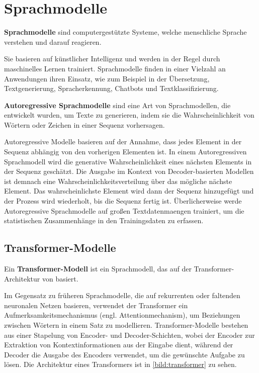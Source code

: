 \section{Sprachmodelle}\label{sec:sprachmodelle}

\begin{definition}\label{def:sprachmodell}
   \textbf{Sprachmodelle} sind computergestützte Systeme, welche menschliche Sprache  verstehen und darauf reagieren.
\end{definition}
Sie basieren auf künstlicher Intelligenz und werden in der Regel durch maschinelles Lernen trainiert.
Sprachmodelle finden in einer Vielzahl an Anwendungen ihren Einsatz, wie zum Beispiel in der Übersetzung,
Textgenerierung, Spracherkennung, Chatbots und Textklassifizierung.

\begin{definition}\label{def:autoregressive-sprachmodelle}
    \textbf{Autoregressive Sprachmodelle} sind eine Art von Sprachmodellen, die entwickelt wurden, um Texte zu generieren,
    indem sie die Wahrscheinlichkeit von Wörtern oder Zeichen in einer Sequenz vorhersagen.
\end{definition}

Autoregressive Modelle basieren auf der Annahme, dass jedes Element in der Sequenz abhängig von den vorherigen Elementen ist.
In einem Autoregressiven Sprachmodell wird die generative Wahrscheinlichkeit eines nächsten Elements in der Sequenz geschätzt.
Die Ausgabe im Kontext von Decoder-basierten Modellen ist demnach eine Wahrscheinlichkeitsverteilung über das mögliche nächste Element.
Das wahrscheinlichste Element wird dann der Sequenz hinzugefügt und der Prozess wird wiederholt, bis die Sequenz fertig ist.
Überlicherweise werde Autoregressive Sprachmodelle auf großen Textdatenmaengen trainiert, um die statistischen Zusammenhänge in den Trainingsdaten zu erfassen.

\subsection{Transformer-Modelle}\label{sec:grundlagen:transformer}

\begin{definition}\label{def:transformer-modell}
    Ein \textbf{Transformer-Modell} ist ein Sprachmodell, das auf der Transformer-Architektur von \citet{attention} basiert.
\end{definition}
Im Gegensatz zu früheren Sprachmodelle, die auf rekurrenten oder faltenden neuronalen Netzen basieren, verwendet der Transformer ein Aufmerksamkeitsmechanismus (engl. Attentionmechanism), um Beziehungen zwischen Wörtern in einem Satz zu modellieren.
Transformer-Modelle bestehen aus einer Stapelung von Encoder- und Decoder-Schichten, wobei der Encoder zur Extraktion von Kontextinformationen aus der Eingabe dient,
während der Decoder die Ausgabe des Encoders verwendet, um die gewünschte Aufgabe zu lösen.
Die Architektur eines Transformers ist in \cref{bild:transformer} zu sehen.\\

